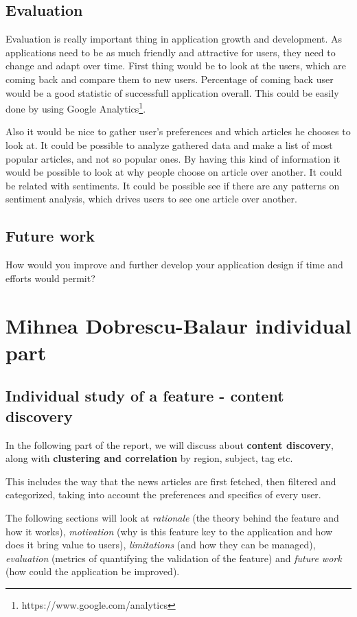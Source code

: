 \documentclass{acm_proc_10ptArticle-sp}
\begin{document}
\subsection{Evaluation}

Evaluation is really important thing in application growth and development. As applications need to be as much friendly and attractive for users, they need to change and adapt over time. First thing would be to look at the users, which are coming back and compare them to new users. Percentage of coming back user would be a good statistic of successfull application overall. This could be easily done by using Google Analytics\footnote{https://www.google.com/analytics}.

Also it would be nice to gather user's preferences and which articles he chooses to look at. It could be possible to analyze gathered data and make a list of most popular articles, and not so popular ones. By having this kind of information it would be possible to look at why people choose on article over another. It could be related with sentiments. It could be possible see if there are any patterns on sentiment analysis, which drives users to see one article over another.

\subsection{Future work}

How would you improve and further develop your application design if time  and efforts would permit?


\section{Mihnea Dobrescu-Balaur individual part}

\subsection{Individual study of a feature - content discovery}

In the following part of the report, we will discuss about \textbf{content discovery}, along with \textbf{clustering and correlation} by region, subject, tag etc.

This includes the way that the news articles are first fetched, then filtered and categorized, taking into account the preferences and specifics of every user.

The following sections will look at \textit{rationale} (the theory behind the feature and how it works), \textit{motivation} (why is this feature key to the application and how does it bring value to users), \textit{limitations} (and how they can be managed), \textit{evaluation} (metrics of quantifying the validation of the feature) and \textit{future work} (how could the application be improved).
\end{document}
